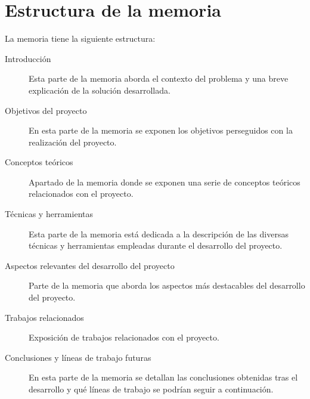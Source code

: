 \section{Estructura de la memoria}

La memoria tiene la siguiente estructura:

\begin{description}
	\item[Introducción] Esta parte de la memoria aborda el contexto del problema y una breve explicación de la solución desarrollada.
	\item[Objetivos del proyecto] En esta parte de la memoria se exponen los objetivos perseguidos con la realización del proyecto. 
	\item[Conceptos teóricos] Apartado de la memoria donde se exponen una serie de conceptos teóricos relacionados con el proyecto.
	\item[Técnicas y herramientas] Esta parte de la memoria está dedicada a la descripción de las diversas técnicas y herramientas empleadas durante el desarrollo del proyecto.
	\item[Aspectos relevantes del desarrollo del proyecto] Parte de la memoria que aborda los aspectos más destacables del desarrollo del proyecto.
	\item[Trabajos relacionados] Exposición de trabajos relacionados con el proyecto.
	\item[Conclusiones y líneas de trabajo futuras] En esta parte de la memoria se detallan las conclusiones obtenidas tras el desarrollo y qué líneas de trabajo se podrían seguir a continuación.
\end{description}
